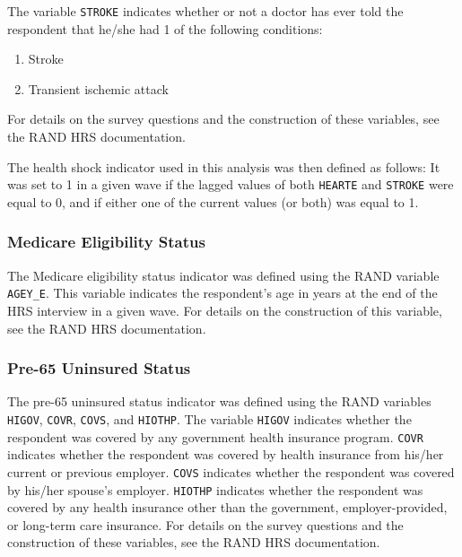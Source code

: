 The variable {\tt STROKE} indicates whether or not a doctor has ever told the respondent that he/she had 1 of the following conditions:
\begin{enumerate}
	\item Stroke
	\item Transient ischemic attack\\
\end{enumerate}

For details on the survey questions and the construction of these variables, see the RAND HRS documentation. %

The health shock indicator used in this analysis was then defined as follows: It was set to 1 in a given wave if the lagged values of both {\tt HEARTE} and {\tt STROKE} were equal to 0, and if either one of the current values (or both) was equal to 1.\\



\subsubsection{Medicare Eligibility Status}
\label{supsec:eligmc}
The Medicare eligibility status indicator was defined using the RAND variable {\tt AGEY\_E}. This variable indicates the respondent's age in years at the end of the HRS interview in a given wave. For details on the construction of this variable, see the RAND HRS documentation. %


\subsubsection{Pre-65 Uninsured Status}
\label{supsec:pre65uninsured}
The pre-65 uninsured status indicator was defined using the RAND variables {\tt HIGOV}, {\tt COVR}, {\tt COVS},  and {\tt HIOTHP}. The variable {\tt HIGOV} indicates whether the respondent was covered by any government health insurance program. {\tt COVR} indicates whether the respondent was covered by health insurance from his/her current or previous employer. {\tt COVS} indicates whether the respondent was covered by his/her spouse's employer. {\tt HIOTHP} indicates whether the respondent was covered by any health insurance other than the government, employer-provided, or long-term care insurance. For details on the survey questions and the construction of these variables, see the RAND HRS documentation. %

